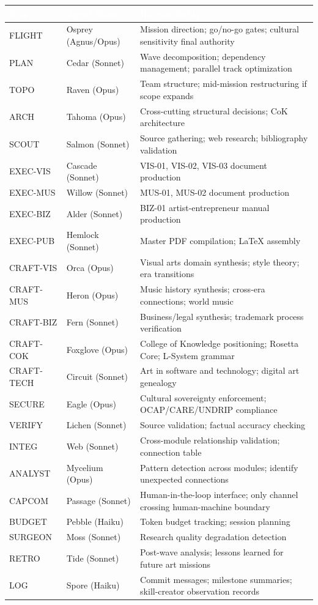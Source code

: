 \documentclass[11pt,letterpaper]{article}
\newcommand{\tableheader}[1]{\textbf{\sffamily\textcolor{white}{#1}}}
\begin{document}
\begin{tabularx}{\textwidth}{L{2cm}L{3.5cm}X}
\toprule
{}
\tableheader{Role} & \tableheader{Agent Name} & \tableheader{Responsibility} \\
\midrule
FLIGHT & Osprey (Agnus/Opus) & Mission direction; go/no-go gates; cultural sensitivity final authority \\
PLAN & Cedar (Sonnet) & Wave decomposition; dependency management; parallel track optimization \\
TOPO & Raven (Opus) & Team structure; mid-mission restructuring if scope expands \\
ARCH & Tahoma (Opus) & Cross-cutting structural decisions; CoK architecture \\
SCOUT & Salmon (Sonnet) & Source gathering; web research; bibliography validation \\
EXEC-VIS & Cascade (Sonnet) & VIS-01, VIS-02, VIS-03 document production \\
EXEC-MUS & Willow (Sonnet) & MUS-01, MUS-02 document production \\
EXEC-BIZ & Alder (Sonnet) & BIZ-01 artist-entrepreneur manual production \\
EXEC-PUB & Hemlock (Sonnet) & Master PDF compilation; LaTeX assembly \\
CRAFT-VIS & Orca (Opus) & Visual arts domain synthesis; style theory; era transitions \\
CRAFT-MUS & Heron (Opus) & Music history synthesis; cross-era connections; world music \\
CRAFT-BIZ & Fern (Sonnet) & Business/legal synthesis; trademark process verification \\
CRAFT-COK & Foxglove (Opus) & College of Knowledge positioning; Rosetta Core; L-System grammar \\
CRAFT-TECH & Circuit (Sonnet) & Art in software and technology; digital art genealogy \\
SECURE & Eagle (Opus) & Cultural sovereignty enforcement; OCAP/CARE/UNDRIP compliance \\
VERIFY & Lichen (Sonnet) & Source validation; factual accuracy checking \\
INTEG & Web (Sonnet) & Cross-module relationship validation; connection table \\
ANALYST & Mycelium (Opus) & Pattern detection across modules; identify unexpected connections \\
CAPCOM & Passage (Sonnet) & Human-in-the-loop interface; only channel crossing human-machine boundary \\
BUDGET & Pebble (Haiku) & Token budget tracking; session planning \\
SURGEON & Moss (Sonnet) & Research quality degradation detection \\
RETRO & Tide (Sonnet) & Post-wave analysis; lessons learned for future art missions \\
LOG & Spore (Haiku) & Commit messages; milestone summaries; skill-creator observation records \\
\bottomrule
\end{tabularx}
\end{document}
